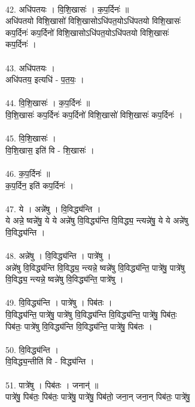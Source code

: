 \\
42. अधि॑पतयः । वि॒शि॒खासः॑ । क॒प॒र्दिनः॑ ॥\\
अधि॑पतयो विशि॒खासो॑ विशि॒खासोऽधि॑पत॒योऽधि॑पतयो विशि॒खासः॑\\
कप॒र्दिनः॑ कप॒र्दिनो॑ विशि॒खासोऽधि॑पत॒योऽधि॑पतयो विशि॒खासः॑\\
कप॒र्दिनः॑ ।\\
\\
43. अधि॑पतयः ।\\
अधि॑पतय॒ इत्यधि॑ - प॒त॒यः॒ ।\\
\\
44. वि॒शि॒खासः॑ । क॒प॒र्दिनः॑ ॥\\
वि॒शि॒खासः॑ कप॒र्दिनः॑ कप॒र्दिनो॑ विशि॒खासो॑ विशि॒खासः॑ कप॒र्दिनः॑ ।\\
\\
45. वि॒शि॒खासः॑ ।\\
वि॒शि॒खास॒ इति॑ वि - शि॒खासः॑ ।\\
\\
46. क॒प॒र्दिनः॑ ॥\\
क॒प॒र्दिन॒ इति॑ कप॒र्दिनः॑ ।\\
\\
47. ये । अन्ने॑षु । वि॒विद्ध्य॑न्ति ।\\
ये अन्ने॒ ष्वन्ने॑षु॒ ये ये अन्ने॑षु वि॒विद्ध्य॑न्ति वि॒विद्ध्य॒ न्त्यन्ने॑षु॒ ये ये अन्ने॑षु\\
वि॒विद्ध्य॑न्ति ।\\
\\
48. अन्ने॑षु । वि॒विद्ध्य॑न्ति । पात्रे॑षु ।\\
अन्ने॑षु वि॒विद्ध्य॑न्ति वि॒विद्ध्य॒ न्त्यन्ने॒ ष्वन्ने॑षु वि॒विद्ध्य॑न्ति॒ पात्रे॑षु॒ पात्रे॑षु\\
वि॒विद्ध्य॒ न्त्यन्ने॒ ष्वन्ने॑षु वि॒विद्ध्य॑न्ति॒ पात्रे॑षु ।\\
\\
49. वि॒विद्ध्य॑न्ति । पात्रे॑षु । पिब॑तः ।\\
वि॒विद्ध्य॑न्ति॒ पात्रे॑षु॒ पात्रे॑षु वि॒विद्ध्य॑न्ति वि॒विद्ध्य॑न्ति॒ पात्रे॑षु॒ पिब॑तः॒\\
पिब॑तः॒ पात्रे॑षु वि॒विद्ध्य॑न्ति वि॒विद्ध्य॑न्ति॒ पात्रे॑षु॒ पिब॑तः ।\\
\\
50. वि॒विद्ध्य॑न्ति ।\\
वि॒विद्ध्य॒न्तीति॑ वि - विद्ध्य॑न्ति ।\\
\\
51. पात्रे॑षु । पिब॑तः । जनान्॑ ॥\\
पात्रे॑षु॒ पिब॑तः॒ पिब॑तः॒ पात्रे॑षु॒ पात्रे॑षु॒ पिब॑तो॒ जना॒न् जना॒न् पिब॑तः॒ पात्रे॑षु॒\\
